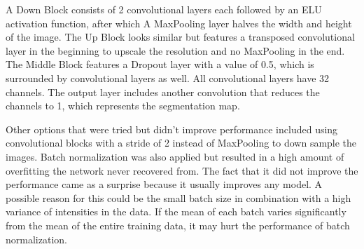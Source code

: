 A Down Block consists of 2 convolutional layers each followed by an ELU activation function, after which A MaxPooling layer halves the width and height of the image. The Up Block looks similar but features a transposed convolutional layer in the beginning to upscale the resolution and no MaxPooling in the end. The Middle Block features a Dropout layer with a value of 0.5, which is surrounded by convolutional layers as well. All convolutional layers have 32 channels. The output layer includes another convolution that reduces the channels to 1, which represents the segmentation map.

Other options that were tried but didn't improve performance included using convolutional blocks with a stride of 2 instead of MaxPooling to down sample the images. Batch normalization was also applied but resulted in a high amount of overfitting the network never recovered from. The fact that it did not improve the performance came as a surprise because it usually improves any model. A possible reason for this could be the small batch size in combination with a high variance of intensities in the data. If the mean of each batch varies significantly from the mean of the entire training data, it may hurt the performance of batch normalization.

\newpage
